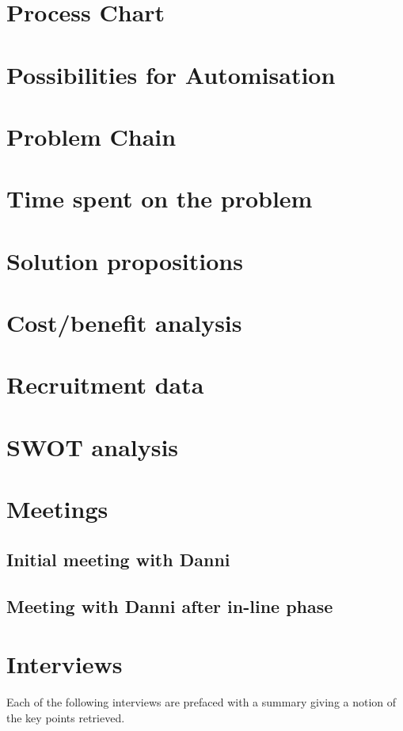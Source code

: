 \chapter{Process Chart}

\chapter{Possibilities for Automisation}

\chapter{Problem Chain}

\chapter{Time spent on the problem}

\chapter{Solution propositions}

\chapter{Cost/benefit analysis}

\chapter{Recruitment data}

\chapter{SWOT analysis}


\chapter{Meetings}
\section{Initial meeting with Danni}

\section{Meeting with Danni after in-line phase}


\chapter{Interviews}
\label{app:interviews}
Each of the following interviews are prefaced with a summary giving a notion of the key points retrieved.

